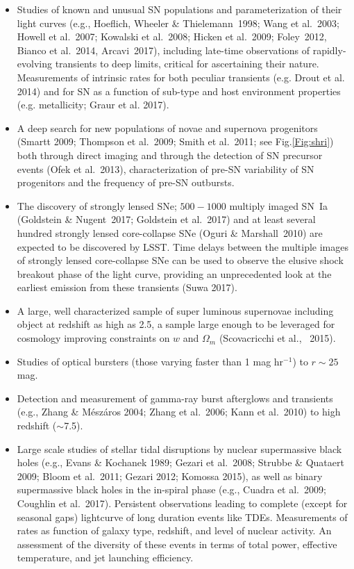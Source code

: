 \begin{itemize}
\item Studies of known and unusual SN populations and parameterization of their light curves (e.g., Hoeflich, Wheeler \& Thielemann~1998; Wang et al.~2003; Howell et al.~2007; Kowalski et al.~2008; Hicken et al.~2009; Foley~2012​, Bianco et al.~2014, Arcavi~2017​), including late-time observations of rapidly-evolving transients to deep limits, critical for ascertaining their nature. Measurements of intrinsic rates for both peculiar transients (e.g. Drout et al. 2014) and for SN as a function of sub-type and host environment properties (e.g. metallicity; Graur et al. 2017).

\item A deep search for new populations of novae and supernova progenitors
      (Smartt 2009; Thompson et al.~2009; Smith et al.~2011; see Fig.\ref{Fig:shri}) both through direct imaging and through the detection of SN precursor events (Ofek et al.~2013), characterization of pre-SN variability of SN progenitors and the frequency of pre-SN outbursts.

\item The discovery of strongly lensed SNe; $500-1000$ multiply imaged SN~Ia (Goldstein \& Nugent~2017; Goldstein et al.~2017) and at least several hundred strongly lensed core-collapse SNe (Oguri \& Marshall~2010) are expected to be discovered by LSST.
  Time delays between the multiple images of strongly lensed core-collapse SNe can be used to observe the elusive shock breakout phase of the light curve, providing an unprecedented look at the earliest emission from these transients (Suwa 2017).

\item A large, well characterized sample of super luminous supernovae
including object at redshift as high as 2.5, a sample large enough to be leveraged for cosmology  improving constraints on $w$ and $\Omega_m$ (Scovacricchi et al., ~2015).

\item Studies of optical bursters (those varying faster than 1 mag hr$^{-1}$) to $r\sim25$ mag.

\item Detection and measurement of gamma-ray burst afterglows and transients
      (e.g., Zhang \& M\'{e}sz\'{a}ros 2004; Zhang et al.~2006; Kann et al.~2010) to high redshift ($\sim$7.5).

\item Large scale studies of stellar tidal disruptions by nuclear supermassive
  black holes (e.g., Evans \& Kochanek 1989; Gezari et al.~2008; Strubbe \&
  Quataert 2009; Bloom et al.~2011; Gezari 2012; Komossa 2015), as well as binary
  supermassive black holes in the in-spiral phase (e.g., Cuadra et
  al.~2009; Coughlin et al.~2017). Persistent observations leading to complete (except for
  seasonal gaps) lightcurve of long duration events like
  TDEs. Measurements of rates as function of galaxy type, redshift,
  and level of nuclear activity. An assessment of the diversity
  of these events in terms of total power, effective temperature, and
  jet launching efficiency.




\end{itemize}

